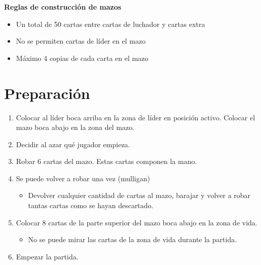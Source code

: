 \documentclass[10pt,a4paper]{article}
\begin{document}
  \begin{shaded}
    \textbf{Reglas de construcción de mazos}
    \begin{itemize}
      \item Un total de 50 cartas entre cartas de luchador y cartas extra
      \item No se permiten cartas de líder en el mazo
      \item Máximo 4 copias de cada carta en el mazo
    \end{itemize}
  \end{shaded}

\section{\textsf{Preparación}}
  \begin{enumerate}
    \item Colocar al líder boca arriba en la zona de líder en posición activo. Colocar el mazo boca abajo en la zona del mazo.
    \item Decidir al azar qué jugador empieza.
    \item Robar 6 cartas del mazo. Estas cartas componen la mano.
    \item Se puede volver a robar una vez (mulligan)
    \begin{itemize}
      \item Devolver cualquier cantidad de cartas al mazo, barajar y volver a robar tantas cartas como se hayan descartado.
    \end{itemize}
    \item Colocar 8 cartas de la parte superior del mazo boca abajo en la zona de vida.
    \begin{itemize}
      \item No se puede mirar las cartas de la zona de vida durante la partida.
    \end{itemize}
    \item Empezar la partida.
  \end{enumerate}
\end{document}
